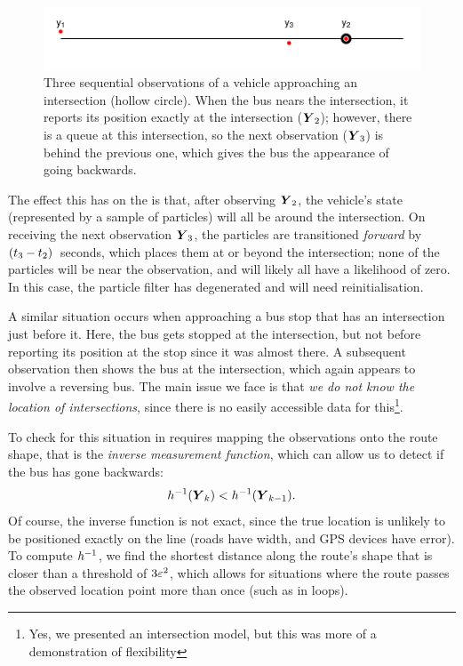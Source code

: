 \begin{knitrout}\small
{}\color{fgcolor}\begin{figure}

{\centering \includegraphics[width=.8\textwidth]{figure/bus_going_backwards-1} 

}

\caption[Three sequential observations of a vehicle approaching an intersection (hollow circle)]{Three sequential observations of a vehicle approaching an intersection (hollow circle). When the bus nears the intersection, it reports its position exactly at the intersection ($\boldsymbol{Y}_2$); however, there is a queue at this intersection, so the next observation ($\boldsymbol{Y}_3$) is behind the previous one, which gives the bus the appearance of going backwards.}\label{fig:bus_going_backwards}
\end{figure}


\end{knitrout}


The effect this has on the \pf{} is that, after observing $\boldsymbol{Y}_2$, the vehicle's state (represented by a sample of particles) will all be around the intersection. On receiving the next observation $\boldsymbol{Y}_3$, the particles are transitioned \emph{forward} by $(t_3 - t_2)$~seconds, which places them at or beyond the intersection; none of the particles will be near the observation, and will likely all have a likelihood of zero. In this case, the particle filter has degenerated and will need reinitialisation.


A similar situation occurs when approaching a bus stop that has an intersection just before it. Here, the bus gets stopped at the intersection, but not before reporting its position at the stop since it was almost there. A subsequent observation then shows the bus at the intersection, which again appears to involve a reversing bus. The main issue we face is that \emph{we do not know the location of intersections}, since there is no easily accessible data for this\footnote{Yes, we presented an intersection model, but this was more of a demonstration of flexibility}.


To check for this situation in \rt{} requires mapping the observations onto the route shape, that is the \emph{inverse measurement function}, which can allow us to detect if the bus has gone backwards:
\begin{equation}
\label{eq:vehicle_rev_check}
h^{-1}(\boldsymbol{Y}_k) < h^{-1}(\boldsymbol{Y}_{k-1}).
\end{equation}
Of course, the inverse function is not exact, since the true location is unlikely to be positioned exactly on the line (roads have width, and GPS devices have error). To compute $h^{-1}$, we find the shortest distance along the route's shape that is closer than a threshold of $3\varepsilon^2$, which allows for situations where the route passes the observed location point more than once (such as in loops).


